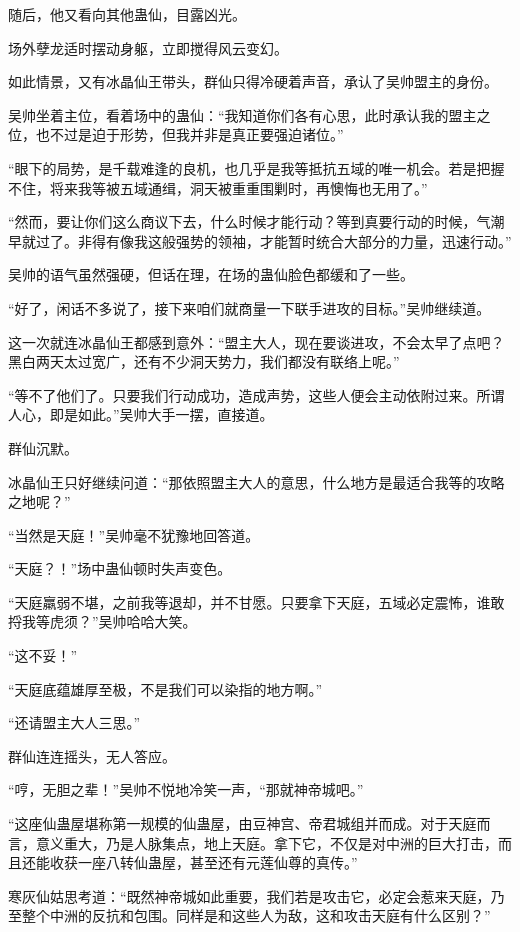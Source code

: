 \begin{this_body}
随后，他又看向其他蛊仙，目露凶光。

场外孽龙适时摆动身躯，立即搅得风云变幻。

如此情景，又有冰晶仙王带头，群仙只得冷硬着声音，承认了吴帅盟主的身份。

吴帅坐着主位，看着场中的蛊仙：“我知道你们各有心思，此时承认我的盟主之位，也不过是迫于形势，但我并非是真正要强迫诸位。”

“眼下的局势，是千载难逢的良机，也几乎是我等抵抗五域的唯一机会。若是把握不住，将来我等被五域通缉，洞天被重重围剿时，再懊悔也无用了。”

“然而，要让你们这么商议下去，什么时候才能行动？等到真要行动的时候，气潮早就过了。非得有像我这般强势的领袖，才能暂时统合大部分的力量，迅速行动。”

吴帅的语气虽然强硬，但话在理，在场的蛊仙脸色都缓和了一些。

“好了，闲话不多说了，接下来咱们就商量一下联手进攻的目标。”吴帅继续道。

这一次就连冰晶仙王都感到意外：“盟主大人，现在要谈进攻，不会太早了点吧？黑白两天太过宽广，还有不少洞天势力，我们都没有联络上呢。”

“等不了他们了。只要我们行动成功，造成声势，这些人便会主动依附过来。所谓人心，即是如此。”吴帅大手一摆，直接道。

群仙沉默。

冰晶仙王只好继续问道：“那依照盟主大人的意思，什么地方是最适合我等的攻略之地呢？”

“当然是天庭！”吴帅毫不犹豫地回答道。

“天庭？！”场中蛊仙顿时失声变色。

“天庭羸弱不堪，之前我等退却，并不甘愿。只要拿下天庭，五域必定震怖，谁敢捋我等虎须？”吴帅哈哈大笑。

“这不妥！”

“天庭底蕴雄厚至极，不是我们可以染指的地方啊。”

“还请盟主大人三思。”

群仙连连摇头，无人答应。

“哼，无胆之辈！”吴帅不悦地冷笑一声，“那就神帝城吧。”

“这座仙蛊屋堪称第一规模的仙蛊屋，由豆神宫、帝君城组并而成。对于天庭而言，意义重大，乃是人脉集点，地上天庭。拿下它，不仅是对中洲的巨大打击，而且还能收获一座八转仙蛊屋，甚至还有元莲仙尊的真传。”

寒灰仙姑思考道：“既然神帝城如此重要，我们若是攻击它，必定会惹来天庭，乃至整个中洲的反抗和包围。同样是和这些人为敌，这和攻击天庭有什么区别？”


\end{this_body}

